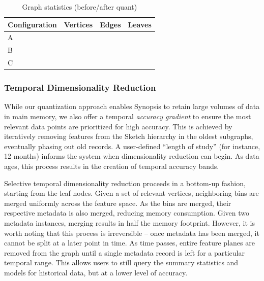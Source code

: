 \begin{table}[h!]
    \renewcommand{\arraystretch}{1.3}
    \caption{Graph statistics (before/after quant)}
    \label{tbl:graph-stats}
    \begin{center}
        \begin{tabular}{|l|c|c|c|}
            \hline
            Configuration & Vertices & Edges & Leaves \\
            \hline
            A & & & \\
            \hline
            B & & & \\
            \hline
            C & & & \\
            \hline
        \end{tabular}
    \end{center}
\end{table}

\subsubsection{Temporal Dimensionality Reduction}
While our quantization approach enables Synopsis to retain large volumes of data in main memory, we also offer a temporal \emph{accuracy gradient} to ensure the most relevant data points are prioritized for high accuracy. This is achieved by iteratively removing features from the Sketch hierarchy in the oldest subgraphs, eventually phasing out old records. A user-defined ``length of study'' (for instance, 12 months) informs the system when dimensionality reduction can begin. As data ages, this process results in the creation of temporal accuracy bands.

Selective temporal dimensionality reduction proceeds in a bottom-up fashion, starting from the leaf nodes. Given a set of relevant vertices, neighboring bins are merged uniformly across the feature space. As the bins are merged, their respective metadata is also merged, reducing memory consumption. Given two metadata instances, merging results in half the memory footprint. However, it is worth noting that this process is irreversible -- once metadata has been merged, it cannot be split at a later point in time. As time passes, entire feature planes are removed from the graph until a single metadata record is left for a particular temporal range. This allows users to still query the summary statistics and models for historical data, but at a lower level of accuracy.

